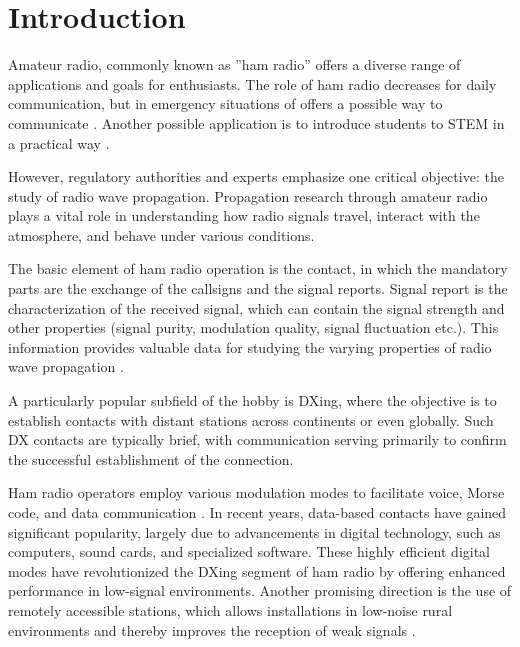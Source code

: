 \documentclass[signals,article,submit,pdftex,moreauthors]{Definitions/mdpi}
\begin{document}
\section{Introduction}

Amateur radio, commonly known as ''ham radio'' offers a diverse range of
applications and goals for enthusiasts. The role of ham radio decreases
for daily communication, but in emergency situations of offers a possible way
to communicate \cite{ryan2025course}. Another possible application is to introduce
students to STEM in a practical way \cite{amin2024ham}.

However, regulatory authorities and
experts emphasize one critical objective: the study of radio wave propagation.
Propagation research \cite{iliev2024algorithms, valvcic2023detection} through
amateur radio plays a vital role in understanding
how radio signals travel, interact with the atmosphere, and behave under
various conditions. 

The basic element of ham radio operation is the contact, in which the mandatory
parts are the exchange of the callsigns and the signal reports. Signal report
is the characterization of the received signal, which can contain the signal strength
and other properties (signal purity, modulation quality, signal fluctuation etc.).
This information provides valuable data for studying the varying properties of radio
wave propagation \cite{silver2011}.

A particularly popular subfield of the hobby is DXing, where the objective is
to establish contacts with distant stations across continents or even globally.
Such DX contacts are typically brief, with communication serving primarily to
confirm the successful establishment of the connection.

Ham radio operators employ various modulation modes to facilitate voice, Morse
code, and data communication \cite{haring2007ham}. In recent years, data-based contacts have gained
significant popularity, largely due to advancements in digital technology, such
as computers, sound cards, and specialized software. These highly efficient
digital modes have revolutionized the DXing segment of ham radio by
offering enhanced performance in low-signal environments.
Another promising direction is the use of remotely accessible stations, which
allows installations in low-noise rural environments and thereby improves the
reception of weak signals \cite{macosky2018development}.
\end{document}
